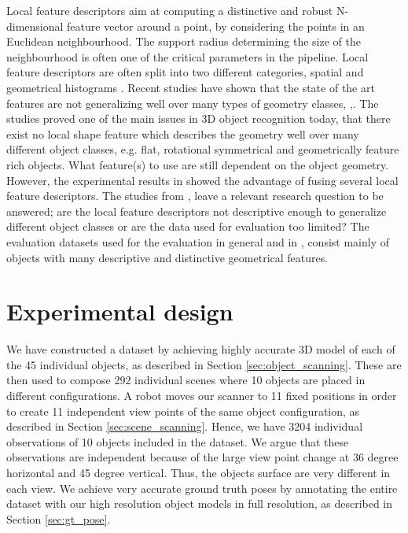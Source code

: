 \documentclass[10pt,twocolumn,letterpaper]{article}
\begin{document}
\indent Local feature descriptors aim at computing a distinctive and robust N-dimensional feature vector around a point, by considering the points in an Euclidean neighbourhood. The support radius determining the size of the neighbourhood is often one of the critical parameters in the pipeline. Local feature descriptors are often split into two different categories, spatial and geometrical histograms \cite{Salti2014}.
Recent studies have shown that the state of the art features are not generalizing well over many types of geometry classes, \cite{Guo2015},\cite{Buch2016}. The studies proved one of the main issues in 3D object recognition today, that there exist no local shape feature which describes the geometry well over many different object classes, e.g. flat, rotational symmetrical and geometrically feature rich objects. What feature(s) to use are still dependent on the object geometry. However, the experimental results in \cite{Buch2016} showed the advantage of fusing several local feature descriptors. 
The studies from \cite{Guo2015},\cite{Buch2016} leave a relevant research question to be answered; are the local feature descriptors not descriptive enough to generalize different object classes or are the data used for evaluation too limited? The evaluation datasets used for the evaluation in general and in \cite{Guo2015},\cite{Buch2016} consist mainly of objects with many descriptive and distinctive geometrical features.\\ 
\section{Experimental design} \label{sec:exp_design}
We have constructed a dataset by achieving highly accurate 3D model of each of the 45 individual objects, as described in Section \ref{sec:object_scanning}. These are then used to compose 292 individual scenes where 10 objects are placed in different configurations. A robot moves our scanner to 11 fixed positions in order to create 11 independent view points of the same object configuration, as described in Section \ref{sec:scene_scanning}. Hence, we have 3204 individual observations of 10 objects included in the dataset. We argue that these observations are independent because of the large view point change at 36 degree horizontal and 45 degree vertical. Thus, the objects surface are very different in each view. We achieve very accurate ground truth poses by annotating the entire dataset with our high resolution object models in full resolution, as described in Section \ref{sec:gt_pose}. 
\end{document}
